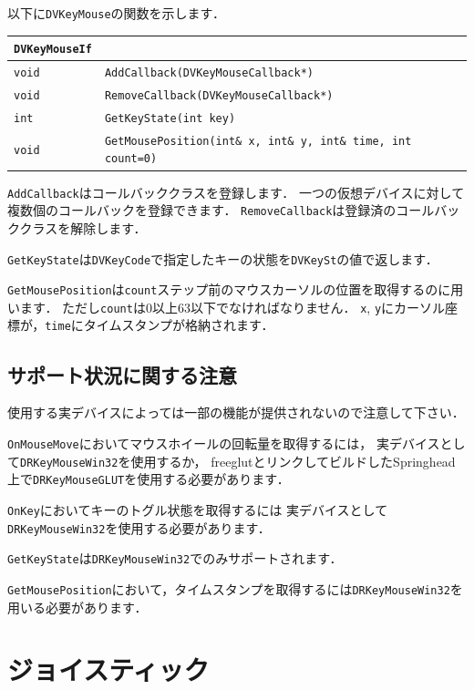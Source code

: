 \KLUDGE 以下に\texttt{DVKeyMouse}の関数を示します．
\begin{center}
\begin{tabular}{p{.1\hsize}p{.8\hsize}}
\texttt{DVKeyMouseIf}																		\\ \midrule
\texttt{void}	& \texttt{AddCallback(DVKeyMouseCallback*)} 	\\
\texttt{void}	& \texttt{RemoveCallback(DVKeyMouseCallback*)} 	\\
\texttt{int}	& \texttt{GetKeyState(int key)}					\\
\texttt{void}	& \texttt{GetMousePosition(int\& x, int\& y, int\& time, int count=0)}
\end{tabular}
\end{center}
\texttt{AddCallback}はコールバッククラスを登録します．
\KLUDGE 一つの仮想デバイスに対して複数個のコールバックを登録できます．
\texttt{RemoveCallback}は登録済のコールバッククラスを解除します．

\texttt{GetKeyState}は\texttt{DVKeyCode}で指定したキーの状態を\texttt{DVKeySt}の値で返します．

\texttt{GetMousePosition}は\texttt{count}ステップ前のマウスカーソルの位置を取得するのに用います．
\KLUDGE ただし\texttt{count}は$0$以上$63$以下でなければなりません．
\texttt{x}, \texttt{y}にカーソル座標が，\texttt{time}にタイムスタンプが格納されます．

\subsection*{サポート状況に関する注意}

\KLUDGE 使用する実デバイスによっては一部の機能が提供されないので注意して下さい．

\texttt{OnMouseMove}においてマウスホイールの回転量を取得するには，
\KLUDGE 実デバイスとして\texttt{DRKeyMouseWin32}を使用するか，
freeglutとリンクしてビルドしたSpringhead上で\texttt{DRKeyMouseGLUT}を使用する必要があります．

\texttt{OnKey}においてキーのトグル状態を取得するには
\KLUDGE 実デバイスとして\texttt{DRKeyMouseWin32}を使用する必要があります．

\texttt{GetKeyState}は\texttt{DRKeyMouseWin32}でのみサポートされます．

\texttt{GetMousePosition}において，タイムスタンプを取得するには\texttt{DRKeyMouseWin32}を用いる必要があります．

\section{ジョイスティック}

